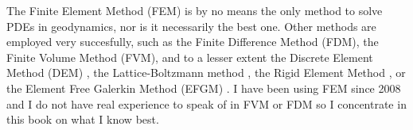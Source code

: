 The Finite Element Method (FEM) is by no means the only method 
to solve PDEs in geodynamics, nor is it necessarily the best one.
Other methods are employed very succesfully, such as the Finite Difference 
Method (FDM), the Finite Volume Method (FVM), and to a lesser extent
the Discrete Element Method (DEM) \cite{tasy05,egho07,egsc07,funi14}, 
the Lattice-Boltzmann method \cite{hupc08}, the Rigid Element Method \cite{lacj15},  
or the Element Free Galerkin Method (EFGM) \cite{hans03}.
I have been using FEM since 2008 and I do not have real 
experience to speak of in FVM or FDM so I concentrate in this book 
on what I know best. 


